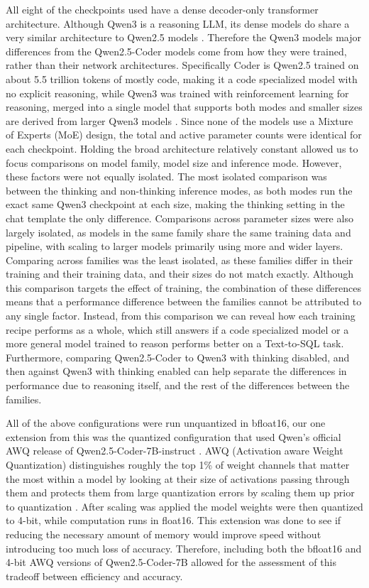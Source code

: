 All eight of the checkpoints used have a dense decoder-only transformer architecture. Although Qwen3 is a reasoning LLM,  its dense models do share a very similar architecture to Qwen2.5 models \citep{yang2025qwen3}. Therefore the Qwen3 models major differences from the Qwen2.5-Coder models come from how they were trained, rather than their network architectures. Specifically Coder is Qwen2.5 trained on about 5.5 trillion tokens of mostly code, making it a code specialized model with no explicit reasoning, while Qwen3 was trained with reinforcement learning for reasoning, merged into a single model that supports both modes and smaller sizes are derived from larger Qwen3 models \citep{hui2024qwen25coder,yang2025qwen3}. Since none of the models use a Mixture of Experts (MoE) design, the total and active parameter counts were identical for each checkpoint. Holding the broad architecture relatively constant allowed us to focus comparisons on model family, model size and inference mode. However, these factors were not equally isolated. The most isolated comparison was between the thinking and non-thinking inference modes, as both modes run the exact same Qwen3 checkpoint at each size, making the thinking setting in the chat template the only difference. Comparisons across parameter sizes were also largely isolated, as models in the same family share the same training data and pipeline, with scaling to larger models primarily using more and wider layers. Comparing across families was the least isolated, as these families differ in their training and their training data, and their sizes do not match exactly. Although this comparison targets the effect of training, the combination of these differences means that a performance difference between the families cannot be attributed to any single factor. Instead, from this comparison we can reveal how each training recipe performs as a whole, which still answers if a code specialized model or a more general model trained to reason performs better on a Text-to-SQL task. Furthermore, comparing Qwen2.5-Coder to Qwen3 with thinking disabled, and then against Qwen3 with thinking enabled can help separate the differences in performance due to reasoning itself, and the rest of the differences between the families.

All of the above configurations were run unquantized in bfloat16, our one extension from this was the quantized configuration that used Qwen’s official AWQ release of Qwen2.5-Coder-7B-instruct \citep{qwen2024awqcard}. AWQ (Activation aware Weight Quantization) distinguishes roughly the top 1\% of weight channels that matter the most within a model by looking at their size of activations passing through them and protects them from large quantization errors by scaling them up prior to quantization \citep{lin2024awq}. After scaling was applied the model weights were then quantized to 4-bit, while computation runs in float16. This extension was done to see if reducing the necessary amount of memory would improve speed without introducing too much loss of accuracy. Therefore, including both the bfloat16 and 4-bit AWQ versions of Qwen2.5-Coder-7B allowed for the assessment of this tradeoff between efficiency and accuracy.

